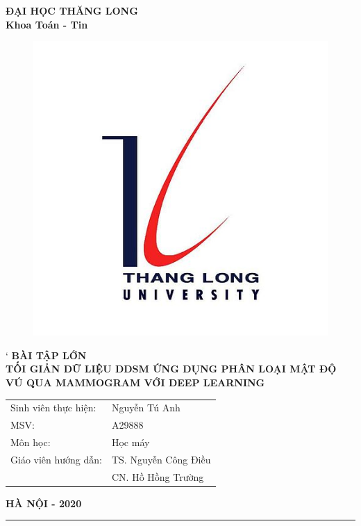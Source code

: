 %
\begin{titlepage}
    \begin{center}
        {\bfseries ĐẠI HỌC THĂNG LONG\\Khoa Toán - Tin}
    \end{center}
    \begin{figure}[!ht]
        \centering
        \includegraphics[scale = 0.4]{LogoTLU}
    \end{figure}
    \begin{center}
`       {\large \bfseries BÀI TẬP LỚN\\}
        \vspace*{1cm}
        {\Large \bfseries  TỐI GIẢN DỮ LIỆU DDSM ỨNG DỤNG PHÂN LOẠI MẬT
        	ĐỘ VÚ QUA MAMMOGRAM VỚI DEEP LEARNING}
    \end{center}
    \vspace*{1cm}
    \begin{flushright}
        \parbox[l]{8cm}{
            \bfseries
            \begin{tabular}{ l  l }
                Sinh viên thực hiện:& Nguyễn Tú Anh \\
                MSV:& A29888  \\
                Môn học:& Học máy\\
                Giáo viên hướng dẫn:& TS. Nguyễn Công Điều\\
                					& CN. Hồ Hồng Trường \\
            \end{tabular}
        }
    \end{flushright}
    \vfill
    \centerline{\bf HÀ NỘI - 2020}
\end{titlepage}
\vfill
\hrule
\thispagestyle{empty}